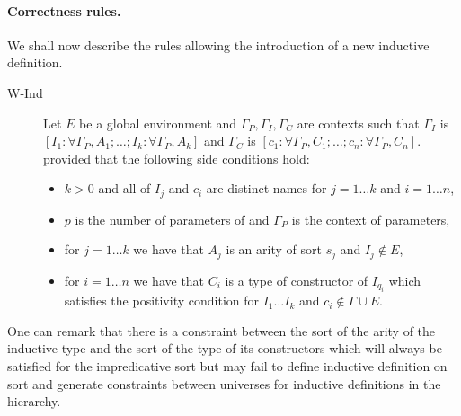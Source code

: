 \paragraph{Correctness rules.}
We shall now describe the rules allowing the introduction of a new
inductive definition.

\begin{description}
\item[W-Ind] Let $E$ be a global environment and
  $\Gamma_P,\Gamma_I,\Gamma_C$ are contexts such that
  $\Gamma_I$ is $[I_1:\forall \Gamma_P,A_1;\ldots;I_k:\forall
  \Gamma_P,A_k]$ and $\Gamma_C$ is 
  $[c_1:\forall \Gamma_P,C_1;\ldots;c_n:\forall \Gamma_P,C_n]$. 
provided that the following side conditions hold:
\begin{itemize}
\item $k>0$ and all of $I_j$ and $c_i$ are distinct names for $j=1\ldots  k$ and $i=1\ldots  n$,
\item $p$ is the number of parameters of 
  and $\Gamma_P$ is the context of parameters, 
\item for $j=1\ldots  k$ we have that $A_j$ is an arity of sort $s_j$ and $I_j
  \notin E$,
\item for $i=1\ldots  n$ we have that $C_i$ is a type of constructor of
  $I_{q_i}$ which satisfies the positivity condition for $I_1 \ldots  I_k$
  and $c_i \notin \Gamma \cup E$.
\end{itemize}
\end{description}
One can remark that there is a constraint between the sort of the
arity of the inductive type and the sort of the type of its
constructors which will always be satisfied for the impredicative sort
{\Prop} but may fail to define inductive definition 
on sort \Set{} and generate constraints between universes for
inductive definitions in the {\Type} hierarchy.


